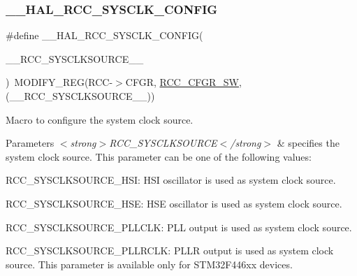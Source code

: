 \subsubsection{\texorpdfstring{\+\_\+\+\_\+\+H\+A\+L\+\_\+\+R\+C\+C\+\_\+\+S\+Y\+S\+C\+L\+K\+\_\+\+C\+O\+N\+F\+IG}{\_\_HAL\_RCC\_SYSCLK\_CONFIG}}
{\footnotesize\ttfamily \#define \+\_\+\+\_\+\+H\+A\+L\+\_\+\+R\+C\+C\+\_\+\+S\+Y\+S\+C\+L\+K\+\_\+\+C\+O\+N\+F\+IG(\begin{DoxyParamCaption}\item[{}]{\+\_\+\+\_\+\+R\+C\+C\+\_\+\+S\+Y\+S\+C\+L\+K\+S\+O\+U\+R\+C\+E\+\_\+\+\_\+ }\end{DoxyParamCaption})~M\+O\+D\+I\+F\+Y\+\_\+\+R\+EG(R\+CC-\/$>$C\+F\+GR, \hyperlink{group___peripheral___registers___bits___definition_ga0eea5e5f7743a7e8995b8beeb18355c1}{R\+C\+C\+\_\+\+C\+F\+G\+R\+\_\+\+SW}, (\+\_\+\+\_\+\+R\+C\+C\+\_\+\+S\+Y\+S\+C\+L\+K\+S\+O\+U\+R\+C\+E\+\_\+\+\_\+))}



Macro to configure the system clock source. 


\begin{DoxyParams}{Parameters}
{\em $<$strong$>$\+R\+C\+C\+\_\+\+S\+Y\+S\+C\+L\+K\+S\+O\+U\+R\+C\+E$<$/strong$>$} & specifies the system clock source. This parameter can be one of the following values\+:
\begin{DoxyItemize}
\item R\+C\+C\+\_\+\+S\+Y\+S\+C\+L\+K\+S\+O\+U\+R\+C\+E\+\_\+\+H\+SI\+: H\+SI oscillator is used as system clock source.
\item R\+C\+C\+\_\+\+S\+Y\+S\+C\+L\+K\+S\+O\+U\+R\+C\+E\+\_\+\+H\+SE\+: H\+SE oscillator is used as system clock source.
\item R\+C\+C\+\_\+\+S\+Y\+S\+C\+L\+K\+S\+O\+U\+R\+C\+E\+\_\+\+P\+L\+L\+C\+LK\+: P\+LL output is used as system clock source.
\item R\+C\+C\+\_\+\+S\+Y\+S\+C\+L\+K\+S\+O\+U\+R\+C\+E\+\_\+\+P\+L\+L\+R\+C\+LK\+: P\+L\+LR output is used as system clock source. This parameter is available only for S\+T\+M32\+F446xx devices. 
\end{DoxyItemize}\\
\hline
\end{DoxyParams}
